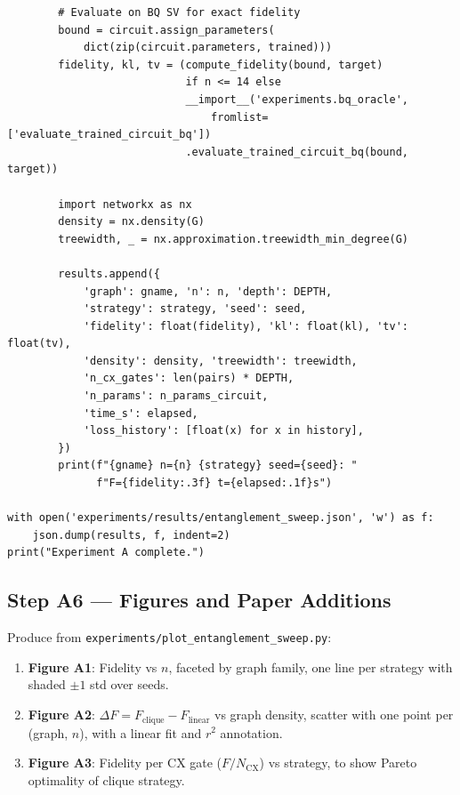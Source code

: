 \documentclass[11pt]{article}
\begin{document}
\begin{lstlisting}
        # Evaluate on BQ SV for exact fidelity
        bound = circuit.assign_parameters(
            dict(zip(circuit.parameters, trained)))
        fidelity, kl, tv = (compute_fidelity(bound, target)
                            if n <= 14 else
                            __import__('experiments.bq_oracle',
                                fromlist=['evaluate_trained_circuit_bq'])
                            .evaluate_trained_circuit_bq(bound, target))

        import networkx as nx
        density = nx.density(G)
        treewidth, _ = nx.approximation.treewidth_min_degree(G)

        results.append({
            'graph': gname, 'n': n, 'depth': DEPTH,
            'strategy': strategy, 'seed': seed,
            'fidelity': float(fidelity), 'kl': float(kl), 'tv': float(tv),
            'density': density, 'treewidth': treewidth,
            'n_cx_gates': len(pairs) * DEPTH,
            'n_params': n_params_circuit,
            'time_s': elapsed,
            'loss_history': [float(x) for x in history],
        })
        print(f"{gname} n={n} {strategy} seed={seed}: "
              f"F={fidelity:.3f} t={elapsed:.1f}s")

with open('experiments/results/entanglement_sweep.json', 'w') as f:
    json.dump(results, f, indent=2)
print("Experiment A complete.")
\end{lstlisting}

\subsection{Step A6 --- Figures and Paper Additions}

Produce from \texttt{experiments/plot\_entanglement\_sweep.py}:
\begin{enumerate}
  \item \textbf{Figure A1}: Fidelity vs $n$, faceted by graph family,
        one line per strategy with shaded $\pm 1$ std over seeds.
  \item \textbf{Figure A2}: $\Delta F = F_{\text{clique}} - F_{\text{linear}}$
        vs graph density, scatter with one point per (graph, $n$),
        with a linear fit and $r^2$ annotation.
  \item \textbf{Figure A3}: Fidelity per CX gate ($F / N_{\text{CX}}$)
        vs strategy, to show Pareto optimality of clique strategy.
\end{enumerate}
\end{document}
